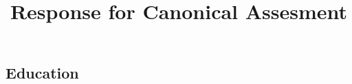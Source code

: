 \documentclass[11pt]{article}
\title{Response for Canonical Assesment}
\date{}
\begin{document}
\maketitle

\subsection*{Education}
\end{document}
